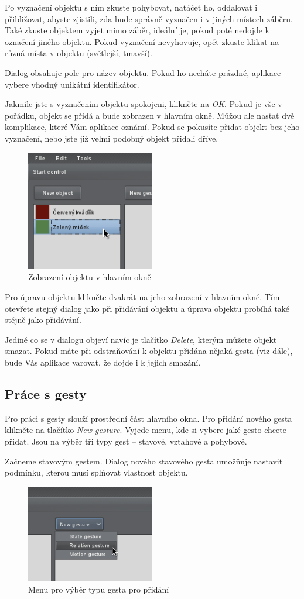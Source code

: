 Po vyznačení objektu s ním zkuste pohybovat, natáčet ho, oddalovat i
přibližovat, abyste zjistili, zda bude správně vyznačen i v jiných místech
záběru. Také zkuste objektem vyjet mimo záběr, ideální je, pokud poté nedojde k
označení jiného objektu. Pokud vyznačení nevyhovuje, opět zkuste klikat na
různá místa v objektu (světlejší, tmavší).

Dialog obsahuje pole pro název objektu. Pokud ho necháte prázdné, aplikace
vybere vhodný unikátní identifikátor.

Jakmile jste s vyznačením objektu spokojeni, klikněte na \emph{OK}. Pokud je
vše v pořádku, objekt se přidá a bude zobrazen v hlavním okně. Můžou ale
nastat dvě komplikace, které Vám aplikace oznámí. Pokud se pokusíte přidat
objekt bez jeho vyznačení, nebo jste již velmi podobný objekt přidali dříve.

\begin{figure}[h]
\centering
\includegraphics[width=0.5\textwidth]{object.png}
\caption{Zobrazení objektu v hlavním okně}
\end{figure}

Pro úpravu objektu klikněte dvakrát na jeho zobrazení v hlavním okně. Tím
otevřete stejný dialog jako při přidávání objektu a úprava objektu probíhá
také stějně jako přidávání.

Jediné co se v dialogu objeví navíc je tlačítko
\emph{Delete}, kterým můžete objekt smazat. Pokud máte při odstraňování k
objektu přidána nějaká gesta (viz dále), bude Vás aplikace varovat, že dojde i
k jejich smazání.

\subsection{Práce s gesty}
Pro práci s gesty slouží prostřední část hlavního okna. Pro přidání nového
gesta klikněte na tlačítko \emph{New gesture}. Vyjede menu, kde si vybere
jaké gesto chcete přidat. Jsou na výběr tři typy gest -- stavové, vztahové a
pohybové.

Začneme stavovým gestem. Dialog nového stavového gesta umožňuje nastavit
podmínku, kterou musí splňovat vlastnost objektu.

\begin{figure}[h]
\centering
\includegraphics[width=0.5\textwidth]{newgesturemenu.png}
\caption{Menu pro výběr typu gesta pro přidání}
\end{figure}
